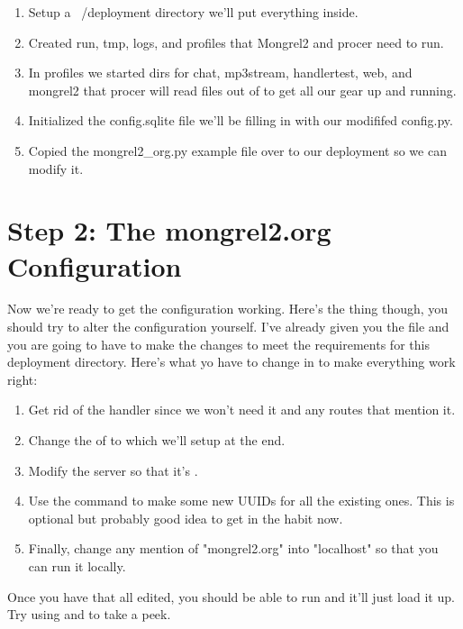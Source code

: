 \begin{enumerate}
\item Setup a ~/deployment directory we'll put everything inside.
\item Created run, tmp, logs, and profiles that Mongrel2 and procer need to run.
\item In profiles we started dirs for chat, mp3stream, handlertest, web, and mongrel2
    that procer will read files out of to get all our gear up and running.
\item Initialized the config.sqlite file we'll be filling in with our modififed config.py.
\item Copied the mongrel2\_org.py example file over to our deployment so we can modify it.
\end{enumerate}


\section{Step 2: The mongrel2.org Configuration}

Now we're ready to get the configuration working.  Here's the thing though, you should 
try to alter the configuration yourself.  I've already given you the file and you are
going to have to make the changes to meet the requirements for this deployment directory.
Here's what yo have to change in  to make everything work right:

\begin{enumerate}
\item Get rid of the  handler since we won't need it and
    any routes that mention it.
\item Change the  of  to  which we'll setup at the end.
\item Modify the server  so that it's .
\item Use the  command to make some new UUIDs for all the 
    existing ones.  This is optional but probably good idea to get in the 
    habit now.
\item Finally, change any mention of "mongrel2.org" into "localhost" so that you
    can run it locally.
\end{enumerate}

Once you have that all edited, you should be able to run  and it'll just load it up.  Try using
 and  to take a peek.


